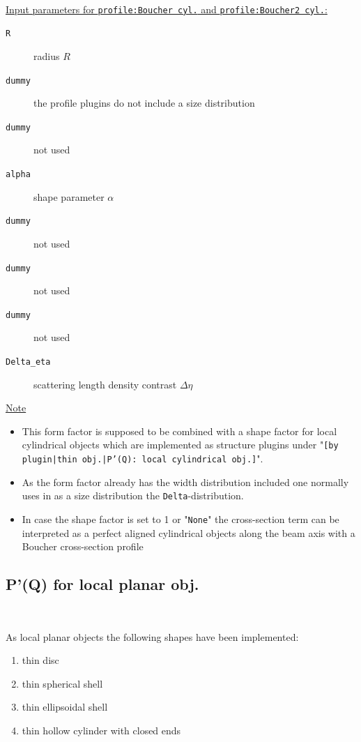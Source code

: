 \hspace{1pt}\\
\underline{Input parameters for \texttt{profile:Boucher cyl.} and \texttt{profile:Boucher2 cyl.}:}
\begin{description}
    \item[\texttt{R}] radius $R$
    \item[\texttt{dummy}] the profile plugins do not include a size distribution
    \item[\texttt{dummy}] not used
    \item[\texttt{alpha}] shape parameter $\alpha$
    \item[\texttt{dummy}] not used
    \item[\texttt{dummy}] not used
    \item[\texttt{dummy}] not used
    \item[\texttt{Delta\_eta}] scattering length density contrast $\Delta \eta$
\end{description}
\noindent
\underline{Note}
\begin{itemize}
  \item This form factor is supposed to be combined with a shape factor for
local cylindrical objects which are implemented as structure  plugins
under "\texttt{[by plugin|thin obj.|P'(Q): local cylindrical obj.]}".
\item As the form factor already has the width distribution included one normally uses in \SASfit as a size distribution
the \texttt{Delta}-distribution.
\item In case the shape factor is set to 1 or "\texttt{None}" the cross-section term can be interpreted as a perfect aligned cylindrical objects along the beam axis with a Boucher cross-section profile
\end{itemize}


\clearpage
\subsection{P'(Q) for local planar obj.} ~\\
\label{plugin:Pprime4planar}

As local planar objects the following shapes have been implemented:
\begin{enumerate}
\item thin disc
\item thin spherical shell
\item thin ellipsoidal shell
\item thin hollow cylinder with closed ends
\end{enumerate}

